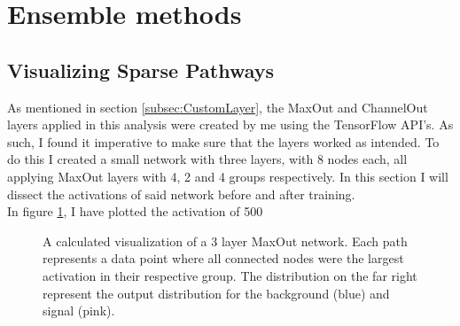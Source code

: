 \section{Ensemble methods}
\subsection{Visualizing Sparse Pathways}
As mentioned in section \ref{subsec:CustomLayer}, the MaxOut and ChannelOut layers applied in this 
analysis were created by me using the TensorFlow \ac{API}'s. As such, I found it imperative to make
sure that the layers worked as intended. To do this I created a small network with three layers, with 8 
nodes each, all applying MaxOut layers with 4, 2 and 4 groups respectively. In this section I will 
dissect the activations of said network before and after training.
\\
In figure \ref{fig:BTraining}, I have plotted the activation of 500
\begin{figure}
    \caption{A calculated visualization of a 3 layer MaxOut network. Each path 
    represents a data point where all connected nodes were the largest activation in their respective 
    group. The distribution on the far right represent the output distribution for the background (blue)
    and signal (pink).
    }
    \label{fig:BTraining}
\end{figure}

